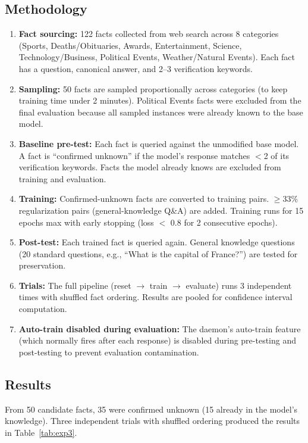 \documentclass[11pt,a4paper]{article}
\begin{document}
\subsection{Methodology}

\begin{enumerate}[noitemsep]
    \item \textbf{Fact sourcing:} 122 facts collected from web search across 8 categories (Sports, Deaths/Obituaries, Awards, Entertainment, Science, Technology/Business, Political Events, Weather/Natural Events). Each fact has a question, canonical answer, and 2--3 verification keywords.
    \item \textbf{Sampling:} 50 facts are sampled proportionally across categories (to keep training time under 2 minutes). Political Events facts were excluded from the final evaluation because all sampled instances were already known to the base model.
    \item \textbf{Baseline pre-test:} Each fact is queried against the unmodified base model. A fact is ``confirmed unknown'' if the model's response matches $<$2 of its verification keywords. Facts the model already knows are excluded from training and evaluation.
    \item \textbf{Training:} Confirmed-unknown facts are converted to training pairs. $\geq$33\% regularization pairs (general-knowledge Q\&A) are added. Training runs for 15 epochs max with early stopping (loss $<$ 0.8 for 2 consecutive epochs).
    \item \textbf{Post-test:} Each trained fact is queried again. General knowledge questions (20 standard questions, e.g., ``What is the capital of France?'') are tested for preservation.
    \item \textbf{Trials:} The full pipeline (reset $\rightarrow$ train $\rightarrow$ evaluate) runs 3 independent times with shuffled fact ordering. Results are pooled for confidence interval computation.
    \item \textbf{Auto-train disabled during evaluation:} The daemon's auto-train feature (which normally fires after each response) is disabled during pre-testing and post-testing to prevent evaluation contamination.
\end{enumerate}

\subsection{Results}

From 50 candidate facts, 35 were confirmed unknown (15 already in the model's knowledge). Three independent trials with shuffled ordering produced the results in Table~\ref{tab:exp3}.
\end{document}

